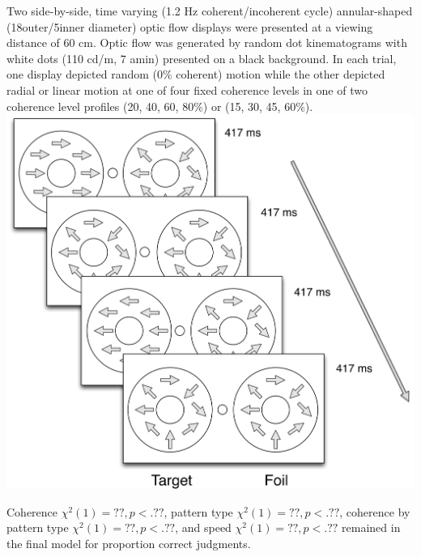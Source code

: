 \documentclass[landscape,final,paperwidth=60in,paperheight=41.5in,fontscale=0.285]{baposter}
\begin{document}
\begin{poster}
{\par
    }
    {
Two side-by-side, time varying (1.2 Hz coherent/incoherent cycle) annular-shaped (18\degree outer/5\degree inner diameter) optic flow displays were presented at a viewing distance of 60 cm. Optic flow was generated by random dot kinematograms with white dots (110 cd/m, 7 amin) presented on a black background. In each trial, one display depicted random (0\% coherent) motion while the other depicted radial or linear motion at one of four fixed coherence levels in one of two coherence level profiles (20, 40, 60, 80\%) or (15, 30, 45, 60\%).
\centering
\includegraphics[scale=0.4]{img/optic-flow-psychophysics-display.png}
    }
    {
Coherence \(\chi^{2}(1)=??, p<.??\), pattern type \(\chi^{2}(1)=??, p<.??\), coherence by pattern type \(\chi^{2}(1)=??, p<.??\), and speed \(\chi^{2}(1)=??, p<.??\) remained in the final model for proportion correct judgments.

}
\end{poster}
\end{document}
